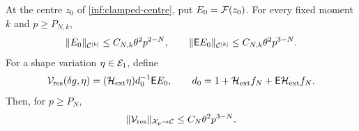 \begin{proposition}
\label{inf:residual-estimates}
At the centre $z_0$ of \eqref{inf:clamped-centre}, put
$E_0=\mathcal F(z_0)$. For every fixed moment $k$ and $p\ge P_{N,k}$,
\begin{equation}\label{inf:residual-moments}
 \lVert E_0\rVert_{\mathcal C^{[k]}}\le C_{N,k}\theta^2p^{2-N},\qquad
 \lVert \mathsf E E_0\rVert_{\mathcal C^{[k]}}\le C_{N,k}\theta^2p^{3-N}.
\end{equation}
For a shape variation $\eta\in\mathcal E_1$, define
\begin{equation}\label{inf:residual-material}
 \mathcal V_{\mathrm{res}}(\delta g,\eta)
       =(\mathcal H_{\mathrm{ext}}\eta)d_0^{-1}\mathsf E E_0,
 \qquad d_0=1+\mathcal H_{\mathrm{ext}} f_N+\mathsf E\mathcal H_{\mathrm{ext}} f_N.
\end{equation}
Then, for $p\ge P_N$,
\begin{equation}\label{inf:residual-material-bound}
 \lVert \mathcal V_{\mathrm{res}}\rVert_{\mathcal X_p\to\mathcal C}
 \le C_N\theta^2p^{3-N}.
\end{equation}
\end{proposition}
